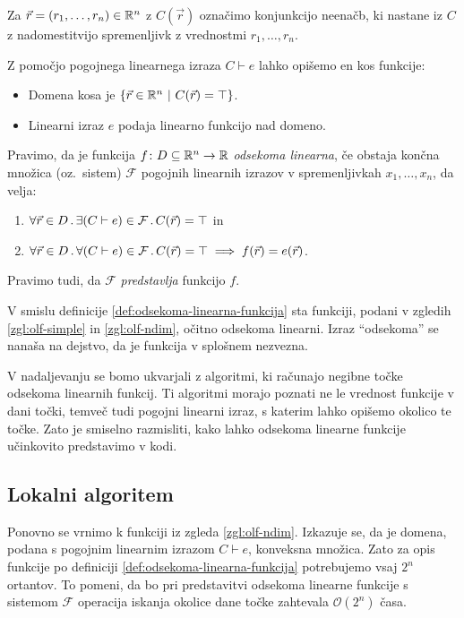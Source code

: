 Za \(\vec{r} = (r_1, \ldots, r_n) \in \mathbb{R}^n\) z \(C(\vec{r})\) označimo konjunkcijo neenačb, ki nastane iz \(C\) z nadomestitvijo spremenljivk z vrednostmi \(r_1, \ldots, r_n\).

\begin{opomba}
  Z pomočjo pogojnega linearnega izraza \(C \vdash e\) lahko opišemo en kos funkcije:
  \begin{itemize}
      \item Domena kosa je \(\left\{\vec{r} \in \mathbb{R}^n \ | \ C(\vec{r}) = \top\right\}\).
      \item Linearni izraz \(e\) podaja linearno funkcijo nad domeno.
  \end{itemize}
\end{opomba}

\begin{definicija}
  \label{def:odsekoma-linearna-funkcija}
    Pravimo, da je funkcija \(f \colon D \subseteq \mathbb{R}^n \to \mathbb{R}\) \emph{odsekoma linearna}, če obstaja končna množica (oz.\ sistem) \(\mathcal{F}\) pogojnih linearnih izrazov v spremenljivkah \(x_1, \ldots, x_n\), da velja:
    \begin{enumerate}
        \item \(\forall \vec{r} \in D \,.\, \exists (C \vdash e) \in \mathcal F \,.\, C(\vec{r}) = \top\) in
        \item \(\forall \vec{r} \in D \,.\, \forall (C \vdash e) \in \mathcal F \,.\, C(\vec{r}) = \top \implies f(\vec{r}) = e(\vec{r})\).
    \end{enumerate}
    Pravimo tudi, da \(\mathcal{F}\) \emph{predstavlja} funkcijo \(f\).
\end{definicija}

\begin{zgled}
  V smislu definicije \ref{def:odsekoma-linearna-funkcija} sta funkciji, podani v zgledih \ref{zgl:olf-simple} in \ref{zgl:olf-ndim}, očitno odsekoma linearni. Izraz "`odsekoma"' se nanaša na dejstvo, da je funkcija v splošnem nezvezna.
\end{zgled}

V nadaljevanju se bomo ukvarjali z algoritmi, ki računajo negibne točke odseko\-ma linearnih funkcij. Ti algoritmi morajo poznati ne le vrednost funkcije v dani točki, temveč tudi pogojni linearni izraz, s katerim lahko opišemo okolico te točke. Zato je smiselno razmisliti, kako lahko odsekoma linearne funkcije učinkovito predstavimo v kodi.

\subsection{Lokalni algoritem}
Ponovno se vrnimo k funkciji iz zgleda \ref{zgl:olf-ndim}. Izkazuje se, da je domena, podana s pogojnim linearnim izrazom \(C \vdash e\), konveksna množica. Zato za opis funkcije po definiciji \ref{def:odsekoma-linearna-funkcija} potrebujemo vsaj \(2^n\) ortantov. To pomeni, da bo pri predstavitvi odsekoma linearne funkcije s sistemom \(\mathcal{F}\) operacija iskanja okolice dane točke zahtevala \(\mathcal{O}(2^n)\) časa. 

